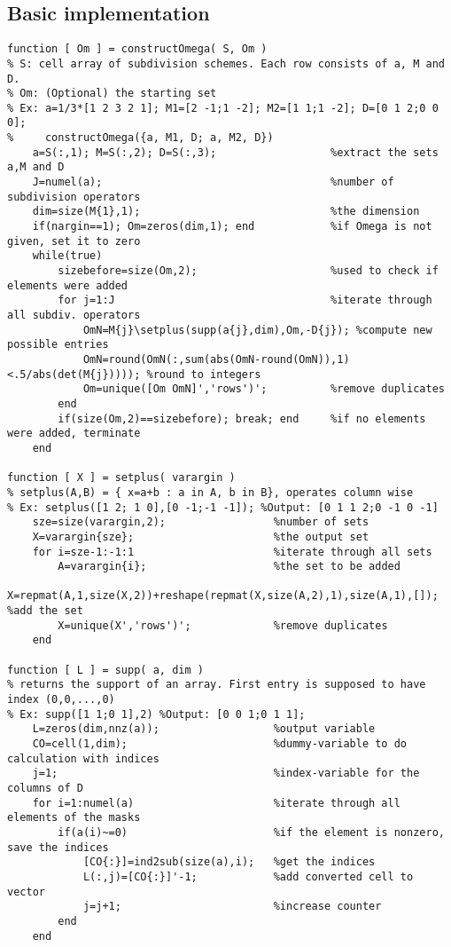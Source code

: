\subsection{Basic implementation}
\begin{lstlisting}
function [ Om ] = constructOmega( S, Om )
% S: cell array of subdivision schemes. Each row consists of a, M and D.
% Om: (Optional) the starting set
% Ex: a=1/3*[1 2 3 2 1]; M1=[2 -1;1 -2]; M2=[1 1;1 -2]; D=[0 1 2;0 0 0];
%     constructOmega({a, M1, D; a, M2, D})
    a=S(:,1); M=S(:,2); D=S(:,3);                  %extract the sets a,M and D
    J=numel(a);                                    %number of subdivision operators
    dim=size(M{1},1);                              %the dimension
    if(nargin==1); Om=zeros(dim,1); end            %if Omega is not given, set it to zero
    while(true)
        sizebefore=size(Om,2);                     %used to check if elements were added 
        for j=1:J                                  %iterate through all subdiv. operators
            OmN=M{j}\setplus(supp(a{j},dim),Om,-D{j}); %compute new possible entries
            OmN=round(OmN(:,sum(abs(OmN-round(OmN)),1)<.5/abs(det(M{j})))); %round to integers
            Om=unique([Om OmN]','rows')';          %remove duplicates
        end
        if(size(Om,2)==sizebefore); break; end     %if no elements were added, terminate
    end
    
function [ X ] = setplus( varargin )
% setplus(A,B) = { x=a+b : a in A, b in B}, operates column wise
% Ex: setplus([1 2; 1 0],[0 -1;-1 -1]); %Output: [0 1 1 2;0 -1 0 -1]
    sze=size(varargin,2);                 %number of sets
    X=varargin{sze};                      %the output set
    for i=sze-1:-1:1                      %iterate through all sets
        A=varargin{i};                    %the set to be added
        X=repmat(A,1,size(X,2))+reshape(repmat(X,size(A,2),1),size(A,1),[]); %add the set
        X=unique(X','rows')';             %remove duplicates
    end
    
function [ L ] = supp( a, dim )
% returns the support of an array. First entry is supposed to have index (0,0,...,0)
% Ex: supp([1 1;0 1],2) %Output: [0 0 1;0 1 1];
    L=zeros(dim,nnz(a));                  %output variable
    CO=cell(1,dim);                       %dummy-variable to do calculation with indices
    j=1;                                  %index-variable for the columns of D
    for i=1:numel(a)                      %iterate through all elements of the masks
        if(a(i)~=0)                       %if the element is nonzero, save the indices
            [CO{:}]=ind2sub(size(a),i);   %get the indices
            L(:,j)=[CO{:}]'-1;            %add converted cell to vector
            j=j+1;                        %increase counter
        end
    end
\end{lstlisting}
 

